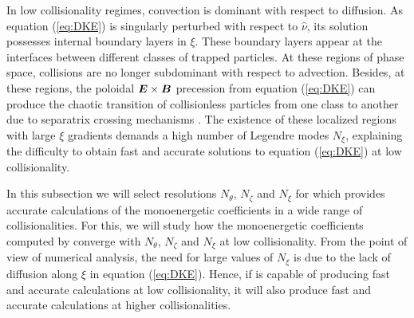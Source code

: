 In low collisionality regimes, convection is dominant with respect to diffusion. As equation (\ref{eq:DKE}) is singularly perturbed with respect to $\hat{\nu}$, its solution possesses internal boundary layers in $\xi$. These boundary layers appear at the interfaces between different classes of trapped particles. At these regions of phase space, collisions are no longer subdominant with respect to advection. Besides, at these regions, the poloidal $\vb*{E}\times\vb*{B}$ precession from equation (\ref{eq:DKE}) can produce the chaotic transition of collisionless particles from one class to another due to separatrix crossing mechanisms \cite{Cary_Separatrix_Crossing, dherbemont2022}. The existence of these localized regions with large $\xi$ gradients demands a high number of Legendre modes $N_\xi$, explaining the difficulty to obtain fast and accurate solutions to equation (\ref{eq:DKE}) at low collisionality. 

In this subsection we will select resolutions $N_\theta$, $N_\zeta$ and $N_\xi$ for which {\MONKES} provides accurate calculations of the monoenergetic coefficients in a wide range of collisionalities. For this, we will study how the monoenergetic coefficients computed by {\MONKES} converge with $N_\theta$, $N_\zeta$ and $N_\xi$ at low collisionality. From the point of view of numerical analysis, the need for large values of $N_\xi$ is due to the lack of diffusion along $\xi$ in equation (\ref{eq:DKE}). Hence, if {\MONKES} is capable of producing fast and accurate calculations at low collisionality, it will also produce fast and accurate calculations at higher collisionalities. 

